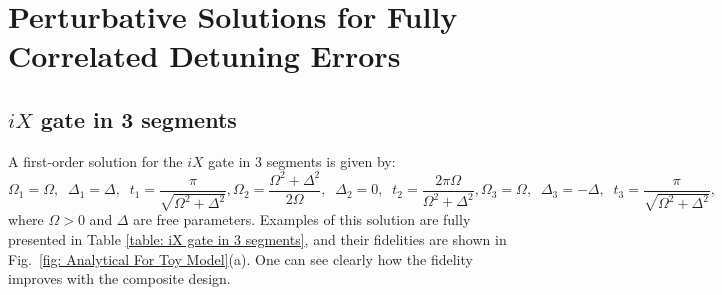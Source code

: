 \documentclass[floatfix,reprint, amsmath,amssymb,aps,superscriptaddress,nofootinbib]{revtex4-2}
\begin{document}
\small


\newpage

\appendix

\section{Perturbative Solutions for Fully Correlated Detuning Errors\label{appendix: Analytical Solutions for The Toy Model}}

\subsection{\texorpdfstring{$iX$}{Lg} gate in 3 segments}

A first-order solution for the $iX$ gate in 3 segments is given by:
\begin{subequations}
\begin{equation}
    \Omega_1=\Omega  , \;\; \Delta_1=\Delta  , \;\; t_1=\frac{\pi}{\sqrt{\Omega^2+\Delta^2}}  , 
\end{equation}
\begin{equation}
    \Omega_2=\frac{\Omega^2+\Delta^2}{2\Omega}  , \;\; \Delta_2=0  , \;\; t_2=\frac{2\pi\Omega}{\Omega^2+\Delta^2}  , 
\end{equation}
\begin{equation}
    \Omega_3=\Omega  , \;\; \Delta_3=-\Delta  , \;\; t_3=\frac{\pi}{\sqrt{\Omega^2+\Delta^2}}  , 
\end{equation}
\label{eq: iX gate in 3 segments}
\end{subequations}
\noindent%
where $\Omega>0$ and $\Delta$ are free parameters. Examples of this solution are fully presented in Table \ref{table: iX gate in 3 segments}, and their fidelities are shown in Fig.~\ref{fig: Analytical For Toy Model}(a). One can see clearly how the fidelity improves with the composite design.
\end{document}
